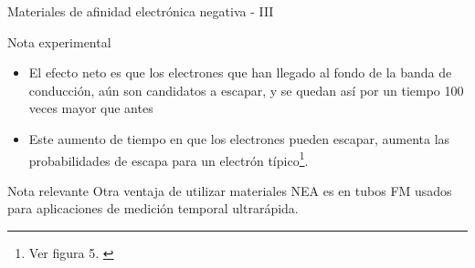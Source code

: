\documentclass[a4paper,10pt]{beamer}
\begin{document}
\begin{frame}{Materiales de afinidad electrónica negativa - III}
 
 \begin{exampleblock}{Nota experimental}
  \begin{itemize}
  \item \begin{justify}
	El efecto neto es que los electrones que han llegado al fondo de la banda 
	de conducción, aún son candidatos a escapar, y se quedan así por un tiempo 100
	veces mayor que antes 
	\end{justify}
 \item \begin{justify}
        Este aumento de tiempo en que los electrones pueden escapar, aumenta 
        las probabilidades de escapa para un electrón típico\footnote{Ver figura
        5. \hyperlink{milink1}{}}.
       \end{justify}
  \end{itemize}
 \end{exampleblock}
 
 \begin{block}{Nota relevante}
  Otra ventaja de utilizar materiales NEA es en tubos FM usados para 
  aplicaciones de medición temporal ultrarápida.
 \end{block}
\end{frame}
\end{document}
